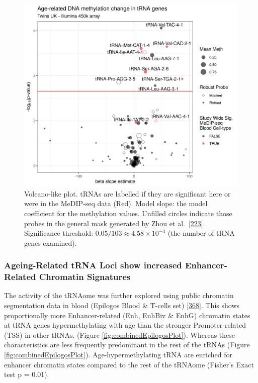 \documentclass[
]{book}
\begin{document}
\begin{figure}

{\centering \includegraphics[width=1\linewidth]{./figs/blood_epitwins450k_Counts_sws_bl_zhou} 

}

\caption{Volcano-like plot. tRNAs are labelled if they are significant here or were in the MeDIP-seq data (Red). Model slope: the model coefficient for the methylation values. Unfilled circles indicate those probes in the general mask generated by Zhou et al.~{[}\protect\hyperlink{ref-Zhou2017}{223}{]}. Significance threshold: \(0.05/103 \approx 4.58\times10^{-4}\) (the number of tRNA genes examined).}\label{fig:bloodEpitwins450kCounts}
\end{figure}



\hypertarget{ageing-related-trna-loci-show-increased-enhancer-related-chromatin-signatures}{%
\subsubsection{Ageing-Related tRNA Loci show increased Enhancer-Related Chromatin Signatures}\label{ageing-related-trna-loci-show-increased-enhancer-related-chromatin-signatures}}

The activity of the tRNAome was further explored using public chromatin segmentation data in blood (Epilogos Blood \& T-cells set) {[}\protect\hyperlink{ref-Meuleman2019}{368}{]}.
This shows proportionally more Enhancer-related (Enh, EnhBiv \& EnhG) chromatin states at tRNA genes hypermethylating with age than the stronger Promoter-related (TSS) in other tRNAs. (Figure \ref{fig:combinedEpilogosPlot}).
Whereas these characteristics are less frequently predominant in the rest of the tRNAs (Figure \ref{fig:combinedEpilogosPlot}).
Age-hypermethylating tRNA are enriched for enhancer chromatin states compared to the rest of the tRNAome (Fisher's Exact test p = 0.01).
\end{document}
